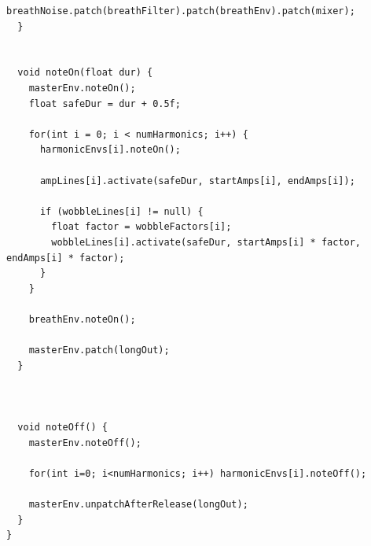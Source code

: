 \begin{lstlisting}[caption={Flute.pde}, label={lst:proc_flute}]
    breathNoise.patch(breathFilter).patch(breathEnv).patch(mixer);
  }
  
  
  void noteOn(float dur) {
    masterEnv.noteOn();
    float safeDur = dur + 0.5f;
    
    for(int i = 0; i < numHarmonics; i++) {
      harmonicEnvs[i].noteOn();
      
      ampLines[i].activate(safeDur, startAmps[i], endAmps[i]);
      
      if (wobbleLines[i] != null) {
        float factor = wobbleFactors[i];
        wobbleLines[i].activate(safeDur, startAmps[i] * factor, endAmps[i] * factor);
      }
    }
    
    breathEnv.noteOn();
    
    masterEnv.patch(longOut); 
  }
  
  
  
  void noteOff() {
    masterEnv.noteOff();
    
    for(int i=0; i<numHarmonics; i++) harmonicEnvs[i].noteOff();
    
    masterEnv.unpatchAfterRelease(longOut); 
  }
}
\end{lstlisting}

